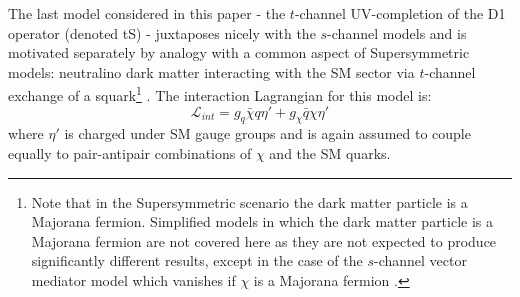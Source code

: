 \begin{flushleft}
\hspace{1cm}The last model considered in this paper - the $t$-channel UV-completion of the D1 operator (denoted tS) - juxtaposes nicely with the $s$-channel models and is motivated separately by analogy with a common aspect of Supersymmetric models: neutralino dark matter interacting with the SM sector via $t$-channel exchange of a squark\footnote{Note that in the Supersymmetric scenario the dark matter particle is a Majorana fermion. Simplified models in which the dark matter particle is a Majorana fermion are not covered here as they are not expected to produce significantly different results, except in the case of the $s$-channel vector mediator model which vanishes if $\chi$ is a Majorana fermion \cite{METSig}.} \cite{SUSYDM}. The interaction Lagrangian for this model is:
\begin{equation}
\label{L_int_tS}
\mathcal{L}_{int} = g_{q}\bar{\chi}q\eta' + g_{\chi}\bar{q}\chi\eta'
\end{equation}
where $\eta'$ is charged under SM gauge groups and is again assumed to couple equally to pair-antipair combinations of $\chi$ and the SM quarks.


\end{flushleft}
